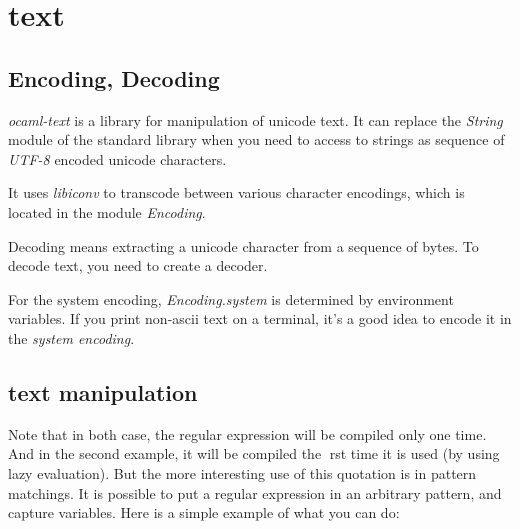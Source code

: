 
\section{text}

\subsection{Encoding, Decoding}
\textit{ocaml-text} is a library for manipulation of unicode text. It
can replace the \textit{String} module of the standard library when
you need to access to strings as sequence of \textit{UTF-8} encoded
unicode characters.

It uses \textit{libiconv} to transcode between various character
encodings, which is located in the module \textit{Encoding}.

Decoding means extracting a unicode character from a sequence of
bytes. To decode text, you need to create a decoder.

For the system encoding, \textit{Encoding.system} is determined by
environment variables. If you print non-ascii text on a terminal, it's
a good idea to encode it in the \textit{system encoding}. 

\subsection{text manipulation}
Note that in both case, the regular expression will be compiled only one
time. And in the second example, it will be compiled the rst time it is used
(by using lazy evaluation).
But the more interesting use of this quotation is in pattern matchings. It
is possible to put a regular expression in an arbitrary pattern, and capture
variables.
Here is a simple example of what you can do:

\inputminted[fontsize=\scriptsize]{ocaml}{code/ocaml-text/patt.ml}
